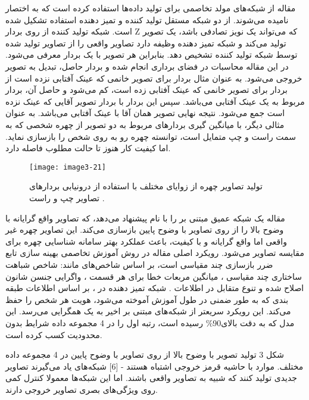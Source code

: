 \noindent
مقاله \cite{radford2016unsupervised} از شبکه‌های مولد تخاصمی برای تولید داده‌ها استفاده کرده است که به اختصار  نامیده می‌شوند.  از دو شبکه مستقل تولید کننده و تمیز دهنده استفاده تشکیل شده است. شبکه تولید کننده از روی بردار Z که می‌تواند یک نویز تصادفی باشد، یک تصویر تولید می‌کند و شبکه تمیز دهنده وظیفه دارد تصاویر واقعی را از تصاویر تولید شده توسط شبکه تولید کننده تشخیص دهد. بنابراین هر تصویر با یک بردار  معرفی می‌شود. در این مقاله محاسبات در فضای برداری انجام شده و بردار حاصل، تبدیل به تصویر خروجی می‌شود. به عنوان مثال بردار  برای تصویر خانمی که عینک آفتابی نزده است از بردار  برای تصویر خانمی که عینک آفتابی زده است، کم می‌شود و حاصل آن، بردار مربوط به یک عینک آفتابی می‌باشد. سپس این بردار با بردار تصویر آقایی که عینک نزده است جمع می‌شود. نتیجه نهایی تصویر همان آقا با عینک آفتابی می‌باشد. به عنوان مثالی دیگر، با میانگین گیری بردارهای مربوط به دو تصویر از چهره شخصی که به سمت راست و چپ متمایل است، توانسته چهره رو به روی شخص را بازسازی نماید. اما کیفیت کار هنوز تا حالت مطلوب فاصله دارد.
 \begin{figure}[h]
\centering
  \texttt{[image: image3-21]}
  \caption{تولید تصاویر چهره از زوایای مختلف با استفاده از درونیابی بردارهای تصاویر چپ و راست \cite{ref1}.}
  \label{image3-21}
\end{figure}

\noindent
مقاله \cite{BANERJEE2018246} یک شبکه عمیق مبتنی بر  را با نام  پیشنهاد می‌دهد، که تصاویر واقع گرایانه با وضوح بالا را از روی تصاویر با وضوح پایین بازسازی می‌کند. این تصاویر چهره غیر واقعی اما واقع گرایانه و با کیفیت، باعث عملکرد بهتر سامانه شناسایی چهره برای مقایسه تصاویر می‌شود. رویکرد اصلی مقاله در روش آموزش تخاصمی  بهینه سازی تابع ضرر بازسازی چند مقیاسی  است، بر اساس شاخص‌های مانند: شاخص شباهت ساختاری چند مقیاسی ، میانگین مربعات خطا برای هر قسمت  ، واگرایی جنسن شانون اصلاح شده   و تنوع متقابل در اطلاعات . 
شبکه تمیز دهنده در ، بر اساس اطلاعات طبقه‌ بندی که به طور ضمنی در طول آموزش آموخته می‌شود، هویت هر شخص را حفظ می‌کند. این رویکرد سریعتر از شبکه‌های مبتنی بر  اخیر به یک همگرایی می‌رسد. این مدل که به دقت بالای90\% رسیده است، رتبه اول را در 4 مجموعه داده شرایط بدون محدودیت کسب کرده است.

  شکل ‏3   تولید تصویر با وضوح بالا از روی تصاویر با وضوح پایین در 4 مجموعه داده مختلف. موارد با حاشیه قرمز خروجی‌ اشتباه هستند - [6]
شبکه‌های  یاد می‌گیرند تصاویر جدیدی تولید کنند که شبیه به تصاویر واقعی باشند. اما این شبکه‌ها معمولا کنترل کمی روی ویژگی‌های بصری تصاویر خروجی دارند.

